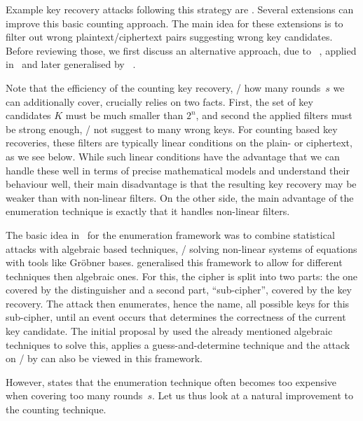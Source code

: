 Example key recovery attacks following this strategy are .
Several extensions can improve this basic counting approach.
The main idea for these extensions is to filter out wrong plaintext/ciphertext pairs suggesting wrong key candidates.
Before reviewing those, we first discuss an alternative approach, due to \citeauthor{FSE:AlbCid09}~, applied in~ and later generalised by \citeauthor{SAC:Dinur14}~.

Note that the efficiency of the counting key recovery, \ie/ how many rounds~$s$ we can additionally cover, crucially relies on two facts.
First, the set of key candidates $K$ must be much smaller than $2^n$, and second the applied filters must be strong enough, \ie/ not suggest to many wrong keys.
For counting based key recoveries, these filters are typically linear conditions on the plain- or ciphertext, as we see below.
While such linear conditions have the advantage that we can handle these well in terms of precise mathematical models and understand their behaviour well, their main disadvantage is that the resulting key recovery may be weaker than with non-linear filters.
On the other side, the main advantage of the enumeration technique is exactly that it handles non-linear filters.

The basic idea in~\cite{FSE:AlbCid09} for the enumeration framework was to combine statistical attacks with algebraic based techniques, \ie/ solving non-linear systems of equations with tools like Gr\"{o}bner bases.
\textcite{SAC:Dinur14} generalised this framework to allow for different techniques then algebraic ones.
For this, the cipher is split into two parts: the one covered by the distinguisher and a second part, \enquote{sub-cipher}, covered by the key recovery.
The attack then enumerates, hence the name, all possible keys for this sub-cipher, until an event occurs that determines the correctness of the current key candidate.
The initial proposal by \citeauthor{FSE:AlbCid09} used the already mentioned algebraic techniques to solve this, \citeauthor{SAC:Dinur14} applies a guess-and-determine technique and the attack on \zorro/ by \textcite{EC:BDDLKT15} can also be viewed in this framework.

However, \textcite[4]{SAC:Dinur14} states that the enumeration technique often becomes too expensive when covering too many rounds~$s$.
Let us thus look at a natural improvement to the counting technique.

